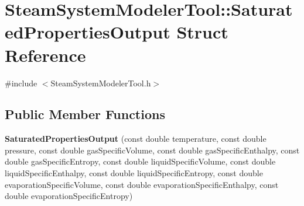 \hypertarget{struct_steam_system_modeler_tool_1_1_saturated_properties_output}{}\section{Steam\+System\+Modeler\+Tool\+:\+:Saturated\+Properties\+Output Struct Reference}
\label{struct_steam_system_modeler_tool_1_1_saturated_properties_output}


{\ttfamily \#include $<$Steam\+System\+Modeler\+Tool.\+h$>$}

\subsection*{Public Member Functions}
\begin{DoxyCompactItemize}
\item 
\mbox{\label{struct_steam_system_modeler_tool_1_1_saturated_properties_output_ae289bc16069f4561e63d60c4983c9f78}} 
{\bfseries Saturated\+Properties\+Output} (const double temperature, const double pressure, const double gas\+Specific\+Volume, const double gas\+Specific\+Enthalpy, const double gas\+Specific\+Entropy, const double liquid\+Specific\+Volume, const double liquid\+Specific\+Enthalpy, const double liquid\+Specific\+Entropy, const double evaporation\+Specific\+Volume, const double evaporation\+Specific\+Enthalpy, const double evaporation\+Specific\+Entropy)
\end{DoxyCompactItemize}
